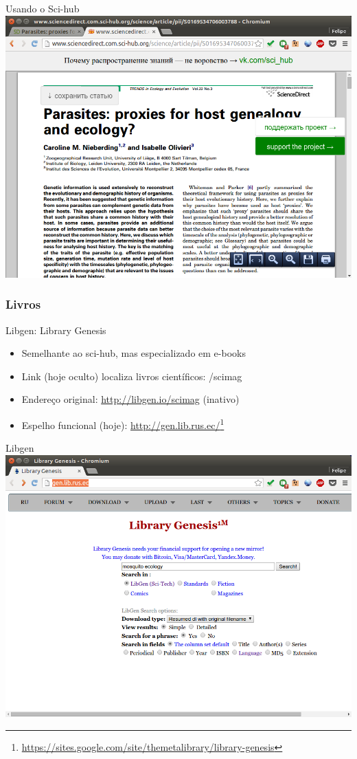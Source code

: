 \documentclass{beamer}
\begin{document}
\begin{frame}{Usando o Sci-hub}
  \includegraphics[height=.85\textheight]{Busca/scihub-busca3}
\end{frame}

\subsubsection{Livros}

\begin{frame}{Libgen: Library Genesis}
  \begin{itemize}
  \item Semelhante ao sci-hub, mas especializado em e-books
  \item Link (hoje oculto) localiza livros científicos:
    \alert{/scimag}
  \item Endereço original: \url{http://libgen.io/scimag} (inativo)
  \item Espelho funcional (hoje): \url{http://gen.lib.rus.ec/}\footnote{\url{https://sites.google.com/site/themetalibrary/library-genesis}}
  \end{itemize}
\end{frame}

\begin{frame}{Libgen}
  \includegraphics[height=.85\textheight]{Busca/libgen-busca1}
\end{frame}
\end{document}
